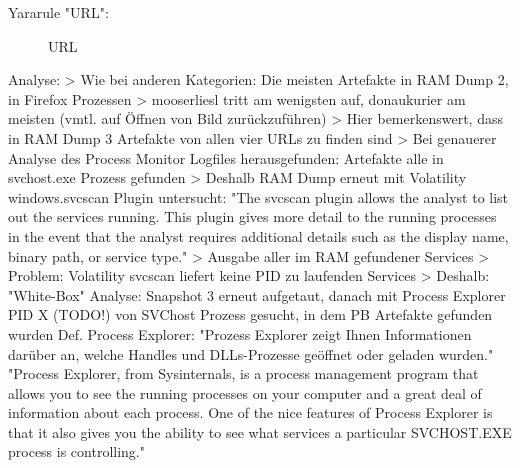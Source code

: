 Yararule "URL":
	\begin{figure}[h!]
		\centerline{}
		\label{chart:final-criteria}  
		\caption{URL}
	\end{figure}
	Analyse:
		> Wie bei anderen Kategorien: Die meisten Artefakte in RAM Dump 2, in Firefox Prozessen
		> mooserliesl tritt am wenigsten auf, donaukurier am meisten (vmtl. auf Öffnen von Bild zurückzuführen)
		> Hier bemerkenswert, dass in RAM Dump 3 Artefakte von allen vier URLs zu finden sind
		> Bei genauerer Analyse des Process Monitor Logfiles herausgefunden: Artefakte alle in svchost.exe Prozess gefunden
		> Deshalb RAM Dump erneut mit Volatility windows.svcscan Plugin untersucht:
			"The svcscan plugin allows the analyst to list out the services running. This plugin gives more detail to the running processes in the event that the analyst requires additional details such as the display name, binary path, or service type." %
		> Ausgabe aller im RAM gefundener Services
		> Problem: Volatility svcscan liefert keine PID zu laufenden Services
		> Deshalb: "White-Box" Analyse: Snapshot 3 erneut aufgetaut, danach mit Process Explorer PID X (TODO!) von SVChost Prozess gesucht, in dem PB Artefakte gefunden wurden
			Def. Process Explorer:
				"Prozess Explorer zeigt Ihnen Informationen darüber an, welche Handles und DLLs-Prozesse geöffnet oder geladen wurden." %
				"Process Explorer, from Sysinternals, is a process management program that allows you to see the running processes on your computer and a great deal of information about each process. One of the nice features of Process Explorer is that it also gives you the ability to see what services a particular SVCHOST.EXE process is controlling."
